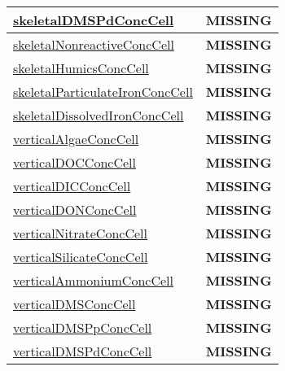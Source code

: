 {\begin{center}
\begin{longtable}{| p{2.0in} | p{4.0in} |}
    \hline
    \hyperref[subsec:var_sec_tracers_aggregate_skeletalDMSPdConcCell]{skeletalDMSPdConcCell} & {\bf \color{red} MISSING} \\
    \hline
    \hyperref[subsec:var_sec_tracers_aggregate_skeletalNonreactiveConcCell]{skeletalNonreactiveConcCell} & {\bf \color{red} MISSING} \\
    \hline
    \hyperref[subsec:var_sec_tracers_aggregate_skeletalHumicsConcCell]{skeletalHumicsConcCell} & {\bf \color{red} MISSING} \\
    \hline
    \hyperref[subsec:var_sec_tracers_aggregate_skeletalParticulateIronConcCell]{skeletalParticulateIronConcCell} & {\bf \color{red} MISSING} \\
    \hline
    \hyperref[subsec:var_sec_tracers_aggregate_skeletalDissolvedIronConcCell]{skeletalDissolvedIronConcCell} & {\bf \color{red} MISSING} \\
    \hline
    \hyperref[subsec:var_sec_tracers_aggregate_verticalAlgaeConcCell]{verticalAlgaeConcCell} & {\bf \color{red} MISSING} \\
    \hline
    \hyperref[subsec:var_sec_tracers_aggregate_verticalDOCConcCell]{verticalDOCConcCell} & {\bf \color{red} MISSING} \\
    \hline
    \hyperref[subsec:var_sec_tracers_aggregate_verticalDICConcCell]{verticalDICConcCell} & {\bf \color{red} MISSING} \\
    \hline
    \hyperref[subsec:var_sec_tracers_aggregate_verticalDONConcCell]{verticalDONConcCell} & {\bf \color{red} MISSING} \\
    \hline
    \hyperref[subsec:var_sec_tracers_aggregate_verticalNitrateConcCell]{verticalNitrateConcCell} & {\bf \color{red} MISSING} \\
    \hline
    \hyperref[subsec:var_sec_tracers_aggregate_verticalSilicateConcCell]{verticalSilicateConcCell} & {\bf \color{red} MISSING} \\
    \hline
    \hyperref[subsec:var_sec_tracers_aggregate_verticalAmmoniumConcCell]{verticalAmmoniumConcCell} & {\bf \color{red} MISSING} \\
    \hline
    \hyperref[subsec:var_sec_tracers_aggregate_verticalDMSConcCell]{verticalDMSConcCell} & {\bf \color{red} MISSING} \\
    \hline
    \hyperref[subsec:var_sec_tracers_aggregate_verticalDMSPpConcCell]{verticalDMSPpConcCell} & {\bf \color{red} MISSING} \\
    \hline
    \hyperref[subsec:var_sec_tracers_aggregate_verticalDMSPdConcCell]{verticalDMSPdConcCell} & {\bf \color{red} MISSING} \\

\end{longtable}
\end{center}}
